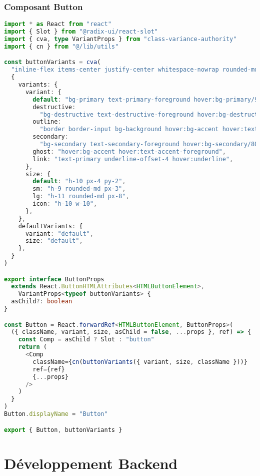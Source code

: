\subsubsection{Composant Button}

\begin{lstlisting}[language=TypeScript, caption=Composant Button réutilisable]
import * as React from "react"
import { Slot } from "@radix-ui/react-slot"
import { cva, type VariantProps } from "class-variance-authority"
import { cn } from "@/lib/utils"

const buttonVariants = cva(
  "inline-flex items-center justify-center whitespace-nowrap rounded-md text-sm font-medium ring-offset-background transition-colors focus-visible:outline-none focus-visible:ring-2 focus-visible:ring-ring focus-visible:ring-offset-2 disabled:pointer-events-none disabled:opacity-50",
  {
    variants: {
      variant: {
        default: "bg-primary text-primary-foreground hover:bg-primary/90",
        destructive:
          "bg-destructive text-destructive-foreground hover:bg-destructive/90",
        outline:
          "border border-input bg-background hover:bg-accent hover:text-accent-foreground",
        secondary:
          "bg-secondary text-secondary-foreground hover:bg-secondary/80",
        ghost: "hover:bg-accent hover:text-accent-foreground",
        link: "text-primary underline-offset-4 hover:underline",
      },
      size: {
        default: "h-10 px-4 py-2",
        sm: "h-9 rounded-md px-3",
        lg: "h-11 rounded-md px-8",
        icon: "h-10 w-10",
      },
    },
    defaultVariants: {
      variant: "default",
      size: "default",
    },
  }
)

export interface ButtonProps
  extends React.ButtonHTMLAttributes<HTMLButtonElement>,
    VariantProps<typeof buttonVariants> {
  asChild?: boolean
}

const Button = React.forwardRef<HTMLButtonElement, ButtonProps>(
  ({ className, variant, size, asChild = false, ...props }, ref) => {
    const Comp = asChild ? Slot : "button"
    return (
      <Comp
        className={cn(buttonVariants({ variant, size, className }))}
        ref={ref}
        {...props}
      />
    )
  }
)
Button.displayName = "Button"

export { Button, buttonVariants }
\end{lstlisting}

\section{Développement Backend}

